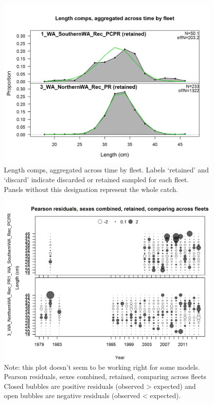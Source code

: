 \documentclass[12pt,]{article}
\begin{document}
\begin{figure}[htbp]
\centering
\includegraphics{./r4ss/plots_mod1/comp_lenfit__aggregated_across_time.png}
\caption{Length comps, aggregated across time by fleet. Labels
`retained' and `discard' indicate discarded or retained sampled for each
fleet. Panels without this designation represent the whole catch.
\label{fig:mod1_9_comp_lenfit__aggregated_across_time}}
\end{figure}

\begin{figure}[htbp]
\centering
\includegraphics{./r4ss/plots_mod1/comp_lenfit_sex1mkt2_multi-fleet_comparison.png}
\caption{Note: this plot doesn't seem to be working right for some
models. Pearson residuals, sexes combined, retained, comparing across
fleets\\
Closed bubbles are positive residuals (observed \textgreater{} expected)
and open bubbles are negative residuals (observed \textless{} expected).
\label{fig:mod1_10_comp_lenfit_sex1mkt2_multi-fleet_comparison}}
\end{figure}
\end{document}
